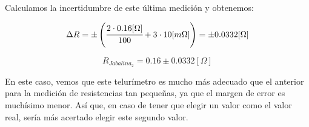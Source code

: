 Calculamos la incertidumbre de este última medición y obtenemos:

\begin{equation*}
    \Delta R = \pm \left( \cfrac{2 \cdot 0.16 [\Omega]}{100} + 3 \cdot 10 [m\Omega] \right) = \pm 0.0332 [\Omega]  
\end{equation*}

\begin{equation*}
    R_{Jabalina_2} = 0.16 \pm 0.0332 [\Omega]
\end{equation*}

En este caso, vemos que este telurímetro es mucho más adecuado que el anterior para la medición de resistencias tan pequeñas, ya que el margen de error es muchísimo menor. Así que, en caso de tener que elegir un valor como el valor real, sería más acertado elegir este segundo valor.

